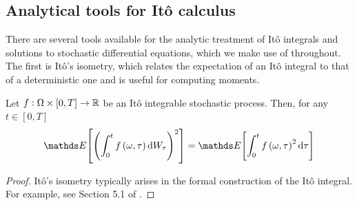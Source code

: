 


\subsection{Analytical tools for It\^o calculus}
There are several tools available for the analytic treatment of It\^o integrals and solutions to stochastic differential equations, which we make use of throughout.
The first is It\^o's isometry, which relates the expectation of an It\^o integral to that of a deterministic one and is useful for computing moments.
\begin{theorem}[It\^o's Isometry]\label{thm:ito_isom}
	Let \(f: \Omega \times [0,T] \to \mathbb{R}\) be an It\^o integrable stochastic process.
	Then, for any \(t \in [0,T]\)
	\[
		\avg{\left(\int_0^t{f\left(\omega, \tau\right)\dif W_\tau}\right)^2} = \avg{\int_0^t{f\left(\omega, \tau\right)^2\dif\tau}}
	\]
\end{theorem}
\begin{proof}
	It\^o's isometry typically arises in the formal construction of the It\^o integral.
	For example, see Section 5.1 of \citet{KallianpurSundar_2014_StochasticAnalysisDiffusion}.
\end{proof}


